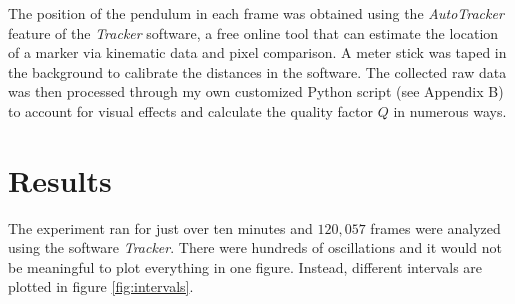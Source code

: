 \documentclass[%
 reprint,
 amsmath,amssymb
 aps,
]{revtex4-2}
\begin{document}
The position of the pendulum in each frame was obtained using the \textit{AutoTracker} feature of the \textit{Tracker} software\cite{tracker}, a free online tool that can estimate the location of a marker via kinematic data and pixel comparison. A meter stick was taped in the background to calibrate the distances in the software. The collected raw data was then processed through my own customized Python script (see Appendix B) to account for visual effects and calculate the quality factor $Q$ in numerous ways. 

\section{Results}
The experiment ran for just over ten minutes and $120,057$ frames were analyzed using the software \textit{Tracker}. There were hundreds of oscillations and it would not be meaningful to plot everything in one figure. Instead, different intervals are plotted in figure \ref{fig:intervals}.
\end{document}
